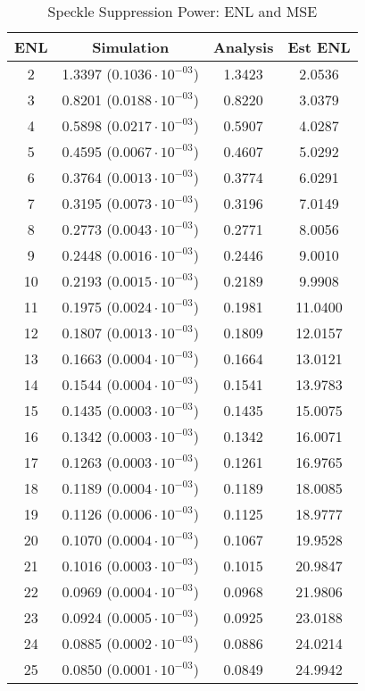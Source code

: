 \documentclass[journal]{IEEEtran}
\begin{document}
\begin{table}
\centering

\begin{tabular}{c|c|c|c}
ENL  & Simulation                      &Analysis   &Est ENL       \\%
\hline
2   &1.3397 ($0.1036 \cdot 10^{-03}$) &1.3423	 &2.0536	\\
3   &0.8201 ($0.0188 \cdot 10^{-03}$) &0.8220	 &3.0379	\\
4   &0.5898 ($0.0217 \cdot 10^{-03}$) &0.5907	 &4.0287	\\
5   &0.4595 ($0.0067 \cdot 10^{-03}$) &0.4607	 &5.0292	\\
6   &0.3764 ($0.0013 \cdot 10^{-03}$) &0.3774	 &6.0291	\\
7   &0.3195 ($0.0073 \cdot 10^{-03}$) &0.3196	 &7.0149	\\
8   &0.2773 ($0.0043 \cdot 10^{-03}$) &0.2771	 &8.0056	\\
9   &0.2448 ($0.0016 \cdot 10^{-03}$) &0.2446	 &9.0010	\\
10  &0.2193 ($0.0015 \cdot 10^{-03}$) &0.2189	 &9.9908	\\
11  &0.1975 ($0.0024 \cdot 10^{-03}$) &0.1981	 &11.0400	\\
12  &0.1807 ($0.0013 \cdot 10^{-03}$) &0.1809	 &12.0157	\\
13  &0.1663 ($0.0004 \cdot 10^{-03}$) &0.1664	 &13.0121	\\
14  &0.1544 ($0.0004 \cdot 10^{-03}$) &0.1541	 &13.9783	\\
15  &0.1435 ($0.0003 \cdot 10^{-03}$) &0.1435	 &15.0075	\\
16  &0.1342 ($0.0003 \cdot 10^{-03}$) &0.1342	 &16.0071	\\
17  &0.1263 ($0.0003 \cdot 10^{-03}$) &0.1261	 &16.9765	\\
18  &0.1189 ($0.0004 \cdot 10^{-03}$) &0.1189	 &18.0085	\\
19  &0.1126 ($0.0006 \cdot 10^{-03}$) &0.1125	 &18.9777	\\
20  &0.1070 ($0.0004 \cdot 10^{-03}$) &0.1067	 &19.9528	\\
21  &0.1016 ($0.0003 \cdot 10^{-03}$) &0.1015	 &20.9847	\\
22  &0.0969 ($0.0004 \cdot 10^{-03}$) &0.0968	 &21.9806	\\
23  &0.0924 ($0.0005 \cdot 10^{-03}$) &0.0925	 &23.0188	\\
24  &0.0885 ($0.0002 \cdot 10^{-03}$) &0.0886	 &24.0214	\\
25  &0.0850 ($0.0001 \cdot 10^{-03}$) &0.0849	 &24.9942	
\end{tabular}

\caption{Speckle Suppression Power: ENL and MSE }
\label{tab:enl_in_log_domain}
\end{table}
\end{document}
